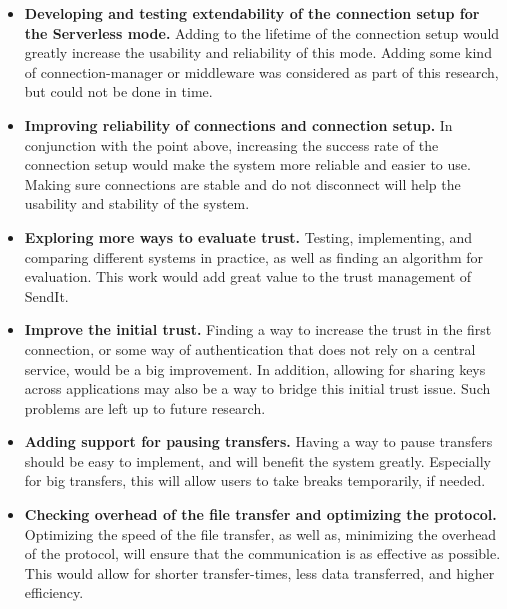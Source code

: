 \begin{itemize}
	\item \textbf{Developing and testing extendability of the connection setup for the Serverless mode.} Adding to the lifetime of the connection setup would greatly increase the usability and reliability of this mode. Adding some kind of connection-manager or middleware was considered as part of this research, but could not be done in time.
	\item \textbf{Improving reliability of connections and connection setup.} In conjunction with the point above, increasing the success rate of the connection setup would make the system more reliable and easier to use. Making sure connections are stable and do not disconnect will help the usability and stability of the system.
	\item \textbf{Exploring more ways to evaluate trust.} Testing, implementing, and comparing different systems in practice, as well as finding an algorithm for evaluation. This work would add great value to the trust management of SendIt.
	\item \textbf{Improve the initial trust.} Finding a way to increase the trust in the first connection, or some way of authentication that does not rely on a central service, would be a big improvement. In addition, allowing for sharing keys across applications may also be a way to bridge this initial trust issue. Such problems are left up to future research.
	\item \textbf{Adding support for pausing transfers.} Having a way to pause transfers should be easy to implement, and will benefit the system greatly. Especially for big transfers, this will allow users to take breaks temporarily, if needed.
	\item \textbf{Checking overhead of the file transfer and optimizing the protocol.} Optimizing the speed of the file transfer, as well as, minimizing the overhead of the protocol, will ensure that the communication is as effective as possible. This would allow for shorter transfer-times, less data transferred, and higher efficiency.
\end{itemize}
%
